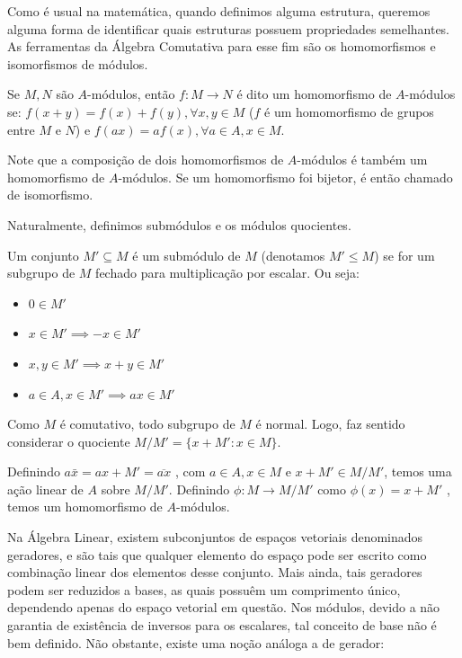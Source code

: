 Como é usual na matemática, quando definimos alguma estrutura, queremos alguma forma de identificar quais estruturas possuem propriedades semelhantes. As ferramentas da Álgebra Comutativa para esse fim são os homomorfismos e isomorfismos de módulos.
\begin{definition}
	\label{loc:def_1_:_módulos_e_homomorfismos.homomorfismo_de_a:módulos}
	Se $M, N$ são $A$-módulos, então $f:M \to N$ é dito um homomorfismo de $A$-módulos se:
	$f(x+y) = f(x) + f(y), \forall x,y \in M$ ($f$ é um homomorfismo de grupos entre $M$ e $N$) e $f(ax) = af(x), \forall a \in A, x \in M$.

	Note que a composição de dois homomorfismos de $A$-módulos é também um homomorfismo de $A$-módulos.	Se um homomorfismo foi bijetor, é então chamado de isomorfismo.
\end{definition}
Naturalmente, definimos submódulos e os módulos quocientes.
\begin{definition}
	\label{loc:def_3_:_submódulos.definição}
	Um conjunto $M' \subseteq M$ é um submódulo de $M$ (denotamos $M' \leq M$) se for um subgrupo de $M$ fechado para multiplicação por escalar. Ou seja:
	\begin{itemize}
		\item $0 \in M'$
		\item $x \in M' \implies -x \in M'$
		\item $x,y \in M' \implies x+y \in M'$
		\item $a \in A, x \in M' \implies ax \in M'$
	\end{itemize}
\end{definition}
\begin{definition}
	\label{loc:def_3_:_submódulos.módulo_quociente}
	Como $M$ é comutativo, todo subgrupo de $M$ é normal. Logo, faz sentido considerar o quociente $M/M'= \{ x +M' : x \in M \}$.
\end{definition}
\begin{observation}
	\label{loc:def_3_:_submódulos.quociente_como_um_a:módulo}
	Definindo $a \bar{x} = ax + M' = \overline{ax}$ , com $a \in A, x \in M$ e $x+M' \in M/M'$, temos uma ação linear de $A$ sobre $M/M'$.
	Definindo $\phi:M \to M/M'$ como $\phi(x) = x+M'$ , temos um homomorfismo de $A$-módulos.
\end{observation}
Na Álgebra Linear, existem subconjuntos de espaços vetoriais denominados geradores, e são tais que qualquer elemento do espaço pode ser escrito como combinação linear dos elementos desse conjunto. Mais ainda, tais geradores podem ser reduzidos a bases, as quais possuêm um comprimento único, dependendo apenas do espaço vetorial em questão. Nos módulos, devido a não garantia de existência de inversos para os escalares, tal conceito de base não é bem definido. Não obstante, existe uma noção análoga a de gerador:
